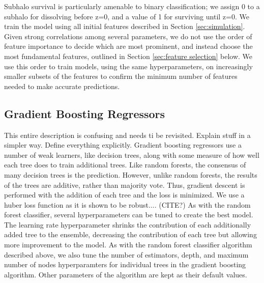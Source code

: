 \documentclass[fleqn,usenatbib]{mnras}
\newcommand\edits[1]{{\color{red}#1}}
\begin{document}
Subhalo survival is particularly amenable to binary classification; we assign 0 to a subhalo for dissolving before z=0, and a value of 1 for surviving until z=0. We train the model using all initial features described in Section \ref{sec:simulation}. Given strong correlations among several parameters, we do not use the order of feature importance to decide which are most prominent, and instead choose the most fundamental features, outlined in Section \ref{sec:feature selection} below. We use this order to train models, using the same hyperparameters, on increasingly smaller subsets of the features to confirm the minimum number of features needed to make accurate predictions.

\subsection{Gradient Boosting Regressors}
\label{sec:gbr} %
\edits{This entire description is confusing and needs ti be revisited. Explain stuff in a simpler way. Define everything explicitly}. Gradient boosting regressors use a number of weak learners, like decision trees, along with some measure of how well each tree does to train additional trees. Like random forests, the consensus of many decision trees is the prediction. However, unlike random forests, the results of the trees are additive, rather than majority vote. Thus, gradient descent is performed with the addition of each tree and the loss is minimized. We use a huber loss function as it is shown to be robust.... (CITE?) As with the random forest classifier, several hyperparameters can be tuned to create the best model. The learning rate hyperparameter shrinks the contribution of each additionally added tree to the ensemble, decreasing the contribution of each tree but allowing more improvement to the model. As with the random forest classifier algorithm described above, we also tune the number of estimators, depth, and maximum number of nodes hyperparamters for individual trees in the gradient boosting algorithm. Other parameters of the algorithm are kept as their default values.
\end{document}
